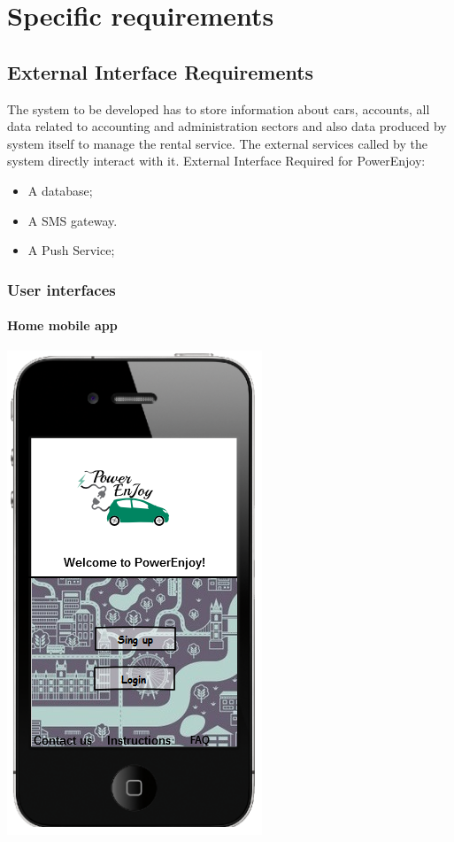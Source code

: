 \chapter{Specific requirements}

\section{External Interface Requirements }
The system to be developed has to store information about cars, accounts, all data related to accounting and administration sectors and also data produced by system itself to manage the rental service. The external services called by the system directly interact with it.
External Interface Required for PowerEnjoy:
\begin{itemize}
\item A database;
\item A SMS gateway.
\item A Push Service;
\end{itemize}

\subsection{User interfaces}
\subsubsection{Home mobile app}
\begin{center}
\includegraphics[]{../images/mookup/Homepage_mobile}
\end{center}

